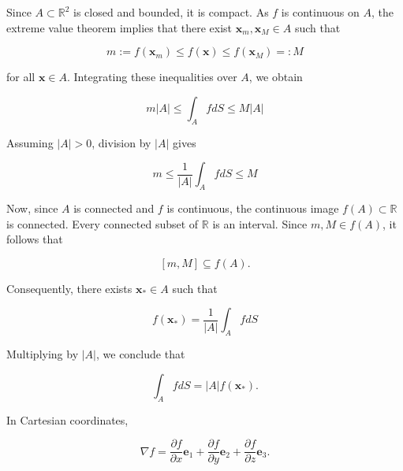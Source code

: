 \begin{formalproof}
  
Since \(A \subset \mathbb{R}^2\) is closed and bounded, it is compact. As \(f\) is continuous on \(A\), the extreme value theorem implies that there exist \(\boldsymbol{x}_m, \boldsymbol{x}_M \in A\) such that

\[
m:=f\left(\boldsymbol{x}_m\right) \leq f(\boldsymbol{x}) \leq f\left(\boldsymbol{x}_M\right)=: M
\]

for all \(\boldsymbol{x} \in A\).
Integrating these inequalities over \(A\), we obtain

\[
m|A| \leq \int_A f d S \leq M|A|
\]

Assuming \(|A|>0\), division by \(|A|\) gives

\[
m \leq \frac{1}{|A|} \int_A f d S \leq M
\]

Now, since \(A\) is connected and \(f\) is continuous, the continuous image \(f(A) \subset \mathbb{R}\) is connected. Every connected subset of \(\mathbb{R}\) is an interval. Since \(m, M \in f(A)\), it follows that

\[
[m, M] \subseteq f(A) .
\]

Consequently, there exists \(\boldsymbol{x}_* \in A\) such that

\[
f\left(\boldsymbol{x}_*\right)=\frac{1}{|A|} \int_A f d S
\]

Multiplying by \(|A|\), we conclude that

\[
\int_A f d S=|A| f\left(\boldsymbol{x}_*\right) .
\]

\end{formalproof}
 


\begin{proposition}
  In Cartesian coordinates,

\[
\nabla f=\frac{\partial f}{\partial x} \boldsymbol{e}_1+\frac{\partial f}{\partial y} \boldsymbol{e}_2+\frac{\partial f}{\partial z} \boldsymbol{e}_3 .
\]
\end{proposition}

